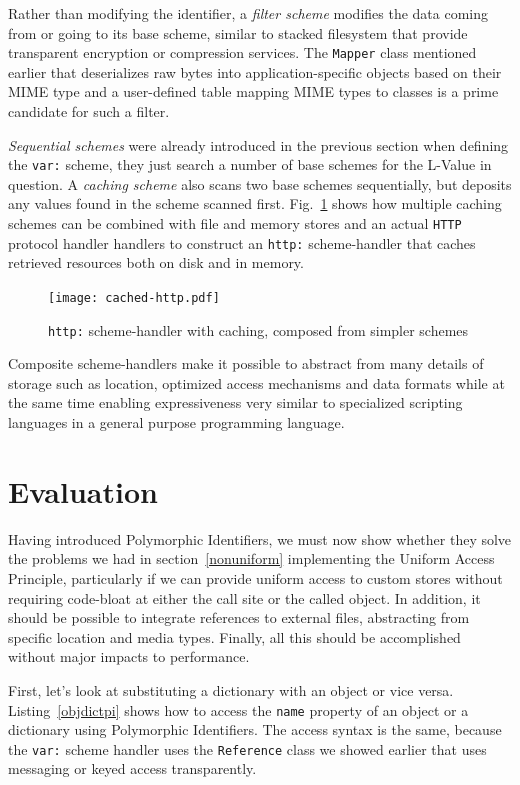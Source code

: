 \documentclass[preprint]{sigplanconf}
\begin{document}
Rather than modifying the identifier, a \emph{filter scheme} modifies the data coming
from or going to its base scheme, similar to stacked filesystem that provide transparent
encryption or compression services.  The {\tt Mapper} class mentioned earlier that 
deserializes raw bytes into application-specific objects based on their MIME type 
and a user-defined table mapping MIME types to classes is a prime candidate for
such a filter.  

\emph{Sequential schemes} were already introduced in the previous section when defining
the {\tt var:} scheme, they just search a number of base schemes for the L-Value in question.
A \emph{caching scheme} also scans two base schemes sequentially, but deposits any 
values found in the scheme scanned first.  Fig.~\ref{fig:http-cached} shows how multiple
caching schemes can be combined with file and memory stores and an actual {\tt HTTP}
protocol handler handlers to construct an {\tt http:} scheme-handler that caches retrieved
resources both on disk and in memory.

\begin{figure}[htbp]
\centering
\texttt{[image: cached-http.pdf]}
\caption{{\tt http:} scheme-handler with caching, composed from simpler schemes}
\label{fig:http-cached}
\end{figure}

Composite scheme-handlers make it possible to abstract from many details of storage
such as location, optimized access mechanisms and data formats while at the same
time enabling expressiveness very similar to specialized scripting languages in
a general purpose programming language.


\section{Evaluation}
\label{evaluation}

Having introduced Polymorphic Identifiers, we must now show whether they solve the
problems we had in section~\ref{nonuniform} implementing the Uniform Access Principle,
particularly if we can provide uniform access to custom stores without requiring code-bloat
at either the call site or the called object.  In addition, it should be possible to integrate
references to external files, abstracting from specific location and media types.  Finally,
all this should be accomplished without major impacts to performance.

First, let's look at substituting a dictionary with an object or vice versa.  Listing~\ref{objdictpi} 
shows how to access the {\tt name} property of an object or a dictionary using Polymorphic
Identifiers.  The access syntax is the same, because the {\tt var:} scheme handler uses 
the {\tt Reference} class we showed earlier that uses messaging or keyed access 
transparently.
\end{document}
